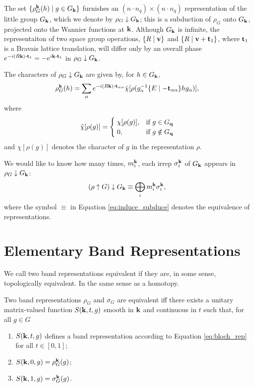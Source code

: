 \n

The set $\{\rho_G^{\vb{k}}(h) \mid g \in G_{\vb{k}}\}$ furnishes an $(n\cdot n_q)\times(n\cdot n_q)$ representation of the little group $G_{\vb{k}}$, which we denote by $\rho_G \downarrow G_{\vb{k}}$; this is a subduction of $\rho_G$ onto $G_{\vb{k}}$, projected onto the Wannier functions at ${\vb{k}}$. Although $G_{\vb{k}}$ is infinite, the representaiton of two space group operations, $\{ R \mid {\vb{v}} \}$ and $\{ R \mid {\vb{v}}+{\vb{t}}_1 \}$, where ${\vb{t}}_1$ is a Bravais lattice translation, will differ only by an overall phase $e^{-i(R\k)\vdot\t_1} = -e^{i\k\vdot\t_1}$ in $\rho_G \downarrow G_{\vb{k}}$.

\n

The characters of $\rho_G \downarrow G_{\vb{k}}$ are given by, for $h \in G_{\vb{k}}$,
$$
\rho_G^\k(h) =
\sum_{\alpha} e^{-i(R\k)\vdot\t_{\alpha\alpha}}
\tilde{\chi}[\rho(g_\alpha^{-1}\sg{E}{-\t_{\alpha\alpha}}h g_\alpha)],
$$
where
\begin{align} \label{eq:tilde_chi}
\tilde{\chi}[\rho(g)] =
\begin{cases}
\; \chi[\rho(g)], & \text{if } g \in G_{\vb{q}} \\
\; 0, & \text{if } g \notin G_{\vb{q}}
\end{cases}
\end{align}
and $\chi[\rho(g)]$ denotes the character of $g$ in the representation $\rho$.

\n

We would like to know how many times, $m_i^{\vb{k}}$, each irrep $\sigma_i^{\vb{k}}$ of $G_{\vb{k}}$ appears in $\rho_G \downarrow G_{\vb{k}}$:
\begin{equation} \label{eq:induce_subduce}
(\rho \uparrow G) \downarrow G_{\vb{k}} \equiv \bigoplus_i m_i^{\vb{k}} \sigma_i^{\vb{k}},
\end{equation}
where the symbol $\equiv$ in Equation \ref{eq:induce_subduce} denotes the equivalence of representations.

\section{Elementary Band Representations}

We call two band representations equivalent if they are, in some sense, topologically equivalent. In the same sense as a homotopy.

\begin{definition} \label{def:equiv_bandrep}
Two band representations $\rho_G$ and $\sigma_G$ are equivalent iff there exists a unitary matrix-valued function $S({\vb{k}},t,g)$ smooth in ${\vb{k}}$ and continuous in $t$ such that, for all $g \in G$
\begin{enumerate}
\item $S({\vb{k}}, t, g)$ defines a band representation according to Equation \ref{eq:bloch_rep} for all $t \in [0,1]$;
\item $S({\vb{k}}, 0, g) = \rho_G^{\vb{k}}(g)$;
\item $S({\vb{k}}, 1, g) = \sigma_G^{\vb{k}}(g)$.
\end{enumerate}
\end{definition}

